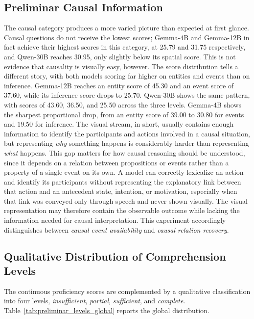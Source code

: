 \subsection*{Preliminar Causal Information}
\label{subsec:preliminary_causal}
The causal category produces a more varied picture than expected at first glance. Causal questions do not receive the lowest scores; Gemma-4B    and Gemma-12B in fact achieve their highest scores in this category, at 25.79 and 31.75 respectively, and Qwen-30B reaches 30.95, only slightly below its spatial score.
This is not evidence that causality is visually easy, however. The score distribution tells a different story, with both models scoring far higher on entities and events than on inference. Gemma-12B reaches an entity score of 45.30 and an event score of 37.60, while its inference score drops to 25.70. Qwen-30B shows the same pattern, with scores of 43.60, 36.50, and 25.50 across the three levels. Gemma-4B    shows the sharpest proportional drop, from an entity score of 39.00 to 30.80 for events and 19.50 for inference. The visual stream, in short, usually contains enough information to identify the participants and actions involved in a causal situation, but representing \textit{why} something happens is considerably harder than representing \textit{what} happens.
This gap matters for how causal reasoning should be understood, since it depends on a relation between propositions or events rather than a property of a single event on its own. A model can correctly lexicalize an action and identify its participants without representing the explanatory link between that action and an antecedent state, intention, or motivation, especially when that link was conveyed only through speech and never shown visually. The visual representation may therefore contain the observable outcome while lacking the information needed for causal interpretation. This experiment accordingly distinguishes between \textit{causal event availability} and \textit{causal relation recovery}.
\subsection*{Qualitative Distribution of Comprehension Levels}
\label{subsec:preliminary_qualitative_levels}

The continuous proficiency scores are complemented by a qualitative classification into four levels, \textit{insufficient}, \textit{partial}, \textit{sufficient}, and \textit{complete}. Table~\ref{tab:preliminar_levels_global} reports the global distribution.


